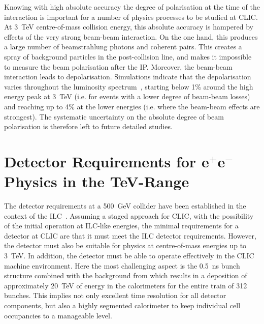 Knowing with high absolute accuracy the degree of polarisation at the 
time of the interaction is important for a number of physics processes to be studied at CLIC\@. 
At 3~TeV centre-of-mass collision energy, this absolute accuracy is hampered by effects of the 
very strong beam-beam interaction. On the one hand, this produces a large number of beamstrahlung 
photons and coherent pairs. This creates a spray of background particles in the post-collision line, 
and makes it impossible to measure the beam polarisation after the IP\@. 
Moreover, the beam-beam interaction leads to depolarisation. 
Simulations indicate that the depolarisation varies throughout the luminosity spectrum~\cite{Bailey_2011, Esberg_2011}, 
starting below 1\% around the high energy peak at 3~TeV 
(i.e. for events with a lower degree of beam-beam losses) and reaching up to 4\% at the lower energies 
(i.e. where the beam-beam effects are strongest). 
The systematic uncertainty on the absolute degree of beam polarisation is therefore 
left to future detailed studies.


\section{\texorpdfstring{Detector Requirements for $\mathbf{e}^{+}\mathbf{e}^{-}$ Physics in the
    TeV-Range}{Detector Requirements for e+e- in the TeV-Range}\label{sec:chapter3:detector_requirements}}

The detector requirements at a 500~GeV \epem collider have been established in
the context of the ILC~\cite{Aihara:2009ad,ildloi:2009}. Assuming a staged
approach for CLIC, with the possibility of the initial operation at ILC-like
energies, the minimal requirements for a detector at CLIC are that it must meet
the \acs{ILC} detector requirements. However, the detector must also be suitable
for physics at centre-of-mass energies up to 3~TeV\@. In addition, the detector
must be able to operate effectively in the CLIC machine environment. Here the
most challenging aspect is the 0.5~ns bunch structure combined with the background
from \gghadrons which results in a deposition of approximately 20~TeV of energy
in the calorimeters for the entire train of 312 bunches. This implies not only
excellent time resolution for all detector components, but also a highly
segmented calorimeter to keep individual cell occupancies to a manageable level.

